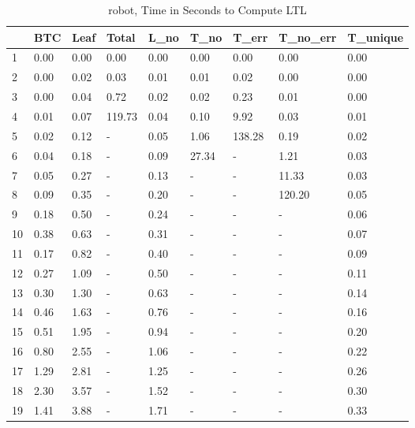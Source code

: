 \begin{table}
\centering
\caption{robot, Time in Seconds to Compute LTL}
\label{robot_LTL_time}
\begin{tabular}{lllllllll}
\toprule
{} &   BTC &  Leaf &   Total &  L\_no &   T\_no &   T\_err & T\_no\_err & T\_unique \\
\midrule
1  &  0.00 &  0.00 &    0.00 &  0.00 &   0.00 &    0.00 &     0.00 &     0.00 \\
2  &  0.00 &  0.02 &    0.03 &  0.01 &   0.01 &    0.02 &     0.00 &     0.00 \\
3  &  0.00 &  0.04 &    0.72 &  0.02 &   0.02 &    0.23 &     0.01 &     0.00 \\
4  &  0.01 &  0.07 &  119.73 &  0.04 &   0.10 &    9.92 &     0.03 &     0.01 \\
5  &  0.02 &  0.12 &       - &  0.05 &   1.06 &  138.28 &     0.19 &     0.02 \\
6  &  0.04 &  0.18 &       - &  0.09 &  27.34 &       - &     1.21 &     0.03 \\
7  &  0.05 &  0.27 &       - &  0.13 &      - &       - &    11.33 &     0.03 \\
8  &  0.09 &  0.35 &       - &  0.20 &      - &       - &   120.20 &     0.05 \\
9  &  0.18 &  0.50 &       - &  0.24 &      - &       - &        - &     0.06 \\
10 &  0.38 &  0.63 &       - &  0.31 &      - &       - &        - &     0.07 \\
11 &  0.17 &  0.82 &       - &  0.40 &      - &       - &        - &     0.09 \\
12 &  0.27 &  1.09 &       - &  0.50 &      - &       - &        - &     0.11 \\
13 &  0.30 &  1.30 &       - &  0.63 &      - &       - &        - &     0.14 \\
14 &  0.46 &  1.63 &       - &  0.76 &      - &       - &        - &     0.16 \\
15 &  0.51 &  1.95 &       - &  0.94 &      - &       - &        - &     0.20 \\
16 &  0.80 &  2.55 &       - &  1.06 &      - &       - &        - &     0.22 \\
17 &  1.29 &  2.81 &       - &  1.25 &      - &       - &        - &     0.26 \\
18 &  2.30 &  3.57 &       - &  1.52 &      - &       - &        - &     0.30 \\
19 &  1.41 &  3.88 &       - &  1.71 &      - &       - &        - &     0.33 \\

\end{tabular}
\end{table}
